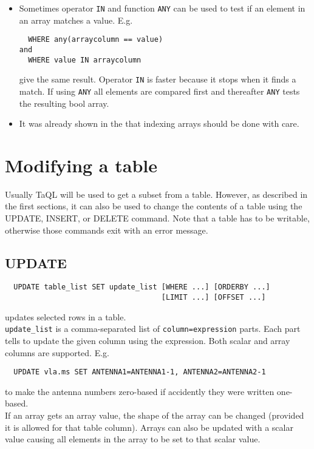 \begin{itemize}
\item
Sometimes operator \texttt{IN} and function \texttt{ANY} can be used to test
if an element in an array matches a value. E.g.
\begin{verbatim}
  WHERE any(arraycolumn == value)
and
  WHERE value IN arraycolumn
\end{verbatim}
give the same result.
Operator \texttt{IN} is faster because it stops when it finds a
match. If using \texttt{ANY} all elements are compared first and thereafter
\texttt{ANY} tests the resulting bool array.

\item
It was already shown in the 
that indexing arrays should be done with care.
\end{itemize}


\section{\label{TAQL:MODIFYING}Modifying a table}
Usually TaQL will be used to get a subset from a table. However, as
described in the first sections, it can also be used to change the
contents of a table using the UPDATE, INSERT, or DELETE command.
Note that a table has to be writable, otherwise those commands
exit with an error message.

\subsection{UPDATE}
\begin{verbatim}
  UPDATE table_list SET update_list [WHERE ...] [ORDERBY ...]
                                    [LIMIT ...] [OFFSET ...]
\end{verbatim}
updates selected rows in a table.
\\\texttt{update\_list}
is a comma-separated list of \texttt{column=expression} parts.
Each part tells to update the given column using the
expression. Both scalar and array columns are supported.
E.g.
\begin{verbatim}
  UPDATE vla.ms SET ANTENNA1=ANTENNA1-1, ANTENNA2=ANTENNA2-1
\end{verbatim}
to make the antenna numbers zero-based if accidently they were
written one-based.
\\If an array gets an array value, the shape of the array can be
changed (provided it is allowed for that table column).
Arrays can also be updated with a scalar value causing all elements
in the array to be set to that scalar value.

